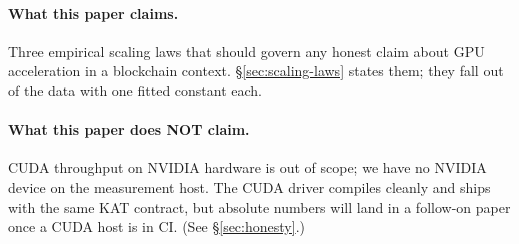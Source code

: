 \paragraph{What this paper claims.} Three empirical scaling laws
that should govern any honest claim about GPU acceleration in a
blockchain context. \S\ref{sec:scaling-laws} states them; they fall
out of the data with one fitted constant each.

\paragraph{What this paper does NOT claim.} CUDA throughput on
NVIDIA hardware is out of scope; we have no NVIDIA device on the
measurement host. The CUDA driver compiles cleanly and ships with
the same KAT contract, but absolute numbers will land in a follow-on
paper once a CUDA host is in CI. (See \S\ref{sec:honesty}.)
